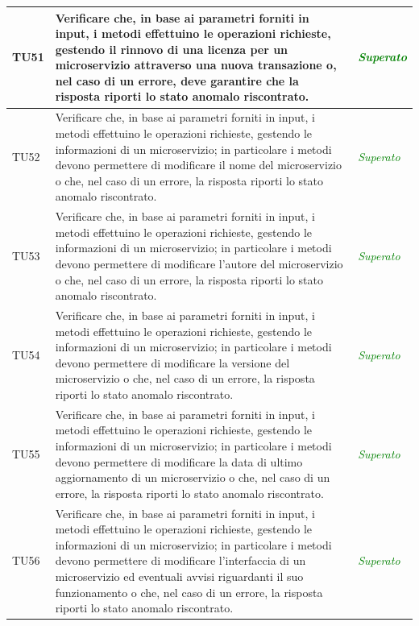 \begin{longtable}{|>{\centering\arraybackslash}p{1.5cm}|>{\centering\arraybackslash}p{8cm} | >{\centering\arraybackslash}p{3.8cm}|}
		\hypertarget{TU51}{TU51} & Verificare che, in base ai parametri forniti in input, i metodi effettuino le operazioni richieste, gestendo il rinnovo di una licenza per un microservizio attraverso una nuova transazione o, nel caso di un errore, deve garantire che la risposta riporti lo stato anomalo riscontrato. & \textcolor{Green}{\textit{Superato}}\\ \hline
		\hypertarget{TU52}{TU52} & Verificare che, in base ai parametri forniti in input, i metodi effettuino le operazioni richieste, gestendo le informazioni di un microservizio; in particolare i metodi devono permettere di modificare il nome del microservizio o che, nel caso di un errore, la risposta riporti lo stato anomalo riscontrato. & \textcolor{Green}{\textit{Superato}}\\ \hline
		\hypertarget{TU53}{TU53} & Verificare che, in base ai parametri forniti in input, i metodi effettuino le operazioni richieste, gestendo le informazioni di un microservizio; in particolare i metodi devono permettere di modificare l'autore del microservizio o che, nel caso di un errore, la risposta riporti lo stato anomalo riscontrato. & \textcolor{Green}{\textit{Superato}}\\ \hline
		\hypertarget{TU54}{TU54} & Verificare che, in base ai parametri forniti in input, i metodi effettuino le operazioni richieste, gestendo le informazioni di un microservizio; in particolare i metodi devono permettere di modificare la versione del microservizio o che, nel caso di un errore, la risposta riporti lo stato anomalo riscontrato. & \textcolor{Green}{\textit{Superato}}\\ \hline
		\hypertarget{TU55}{TU55} & Verificare che, in base ai parametri forniti in input, i metodi effettuino le operazioni richieste, gestendo le informazioni di un microservizio; in particolare i metodi devono permettere di modificare la data di ultimo aggiornamento di un microservizio o che, nel caso di un errore, la risposta riporti lo stato anomalo riscontrato. & \textcolor{Green}{\textit{Superato}}\\ \hline
		\hypertarget{TU56}{TU56} & Verificare che, in base ai parametri forniti in input, i metodi effettuino le operazioni richieste, gestendo le informazioni di un microservizio; in particolare i metodi devono permettere di modificare l'interfaccia di un microservizio ed eventuali avvisi riguardanti il suo funzionamento o che, nel caso di un errore, la risposta riporti lo stato anomalo riscontrato. & \textcolor{Green}{\textit{Superato}}\\ \hline

\end{longtable}
